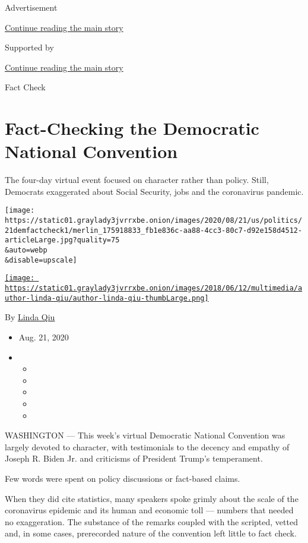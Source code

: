 Advertisement

\protect\hyperlink{after-top}{Continue reading the main story}

Supported by

\protect\hyperlink{after-sponsor}{Continue reading the main story}

Fact Check

\hypertarget{fact-checking-the-democratic-national-convention}{%
\section{Fact-Checking the Democratic National
Convention}\label{fact-checking-the-democratic-national-convention}}

The four-day virtual event focused on character rather than policy.
Still, Democrats exaggerated about Social Security, jobs and the
coronavirus pandemic.

\texttt{[image: https://static01.graylady3jvrrxbe.onion/images/2020/08/21/us/politics/21demfactcheck1/merlin\_175918833\_fb1e836c-aa88-4cc3-80c7-d92e158d4512-articleLarge.jpg?quality=75\\\&auto=webp\\\&disable=upscale]}

\href{https://www.nytimes3xbfgragh.onion/by/linda-qiu}{\texttt{[image: https://static01.graylady3jvrrxbe.onion/images/2018/06/12/multimedia/author-linda-qiu/author-linda-qiu-thumbLarge.png]}}

By \href{https://www.nytimes3xbfgragh.onion/by/linda-qiu}{Linda Qiu}

\begin{itemize}
\item
  Aug. 21, 2020
\item
  \begin{itemize}
  \item
  \item
  \item
  \item
  \item
  \end{itemize}
\end{itemize}

WASHINGTON --- This week's virtual Democratic National Convention was
largely devoted to character, with testimonials to the decency and
empathy of Joseph R. Biden Jr. and criticisms of President Trump's
temperament.

Few words were spent on policy discussions or fact-based claims.

When they did cite statistics, many speakers spoke grimly about the
scale of the coronavirus epidemic and its human and economic toll ---
numbers that needed no exaggeration. The substance of the remarks
coupled with the scripted, vetted and, in some cases, prerecorded nature
of the convention left little to fact check.


